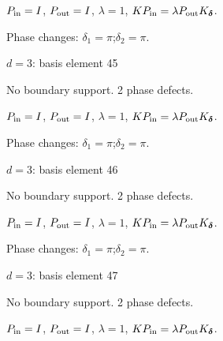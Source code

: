 \vspace{-1mm}
$P_{\rm in}=I$, \quad $P_{\rm out}=I$, \quad $\lambda=1$, \qquad $K P_{\rm in}=\lambda P_{\rm out}K_{\boldsymbol\delta}$.
\par\smallskip\begin{minipage}{.98\linewidth}\small Phase changes: $\delta_{1}=\pi$;\quad $\delta_{2}=\pi$.\end{minipage}
\vfill
{\footnotesize\texttt{}}
\newpage
{}
{\Large $d=3$: basis element 45}\par
No boundary support. 2 phase defects.
\begin{center}
\end{center}
\vspace{-1mm}
$P_{\rm in}=I$, \quad $P_{\rm out}=I$, \quad $\lambda=1$, \qquad $K P_{\rm in}=\lambda P_{\rm out}K_{\boldsymbol\delta}$.
\par\smallskip\begin{minipage}{.98\linewidth}\small Phase changes: $\delta_{1}=\pi$;\quad $\delta_{2}=\pi$.\end{minipage}
\vfill
{\footnotesize\texttt{}}
\newpage
{}
{\Large $d=3$: basis element 46}\par
No boundary support. 2 phase defects.
\begin{center}
\end{center}
\vspace{-1mm}
$P_{\rm in}=I$, \quad $P_{\rm out}=I$, \quad $\lambda=1$, \qquad $K P_{\rm in}=\lambda P_{\rm out}K_{\boldsymbol\delta}$.
\par\smallskip\begin{minipage}{.98\linewidth}\small Phase changes: $\delta_{1}=\pi$;\quad $\delta_{2}=\pi$.\end{minipage}
\vfill
{\footnotesize\texttt{}}
\newpage
{}
{\Large $d=3$: basis element 47}\par
No boundary support. 2 phase defects.
\begin{center}
\end{center}
\vspace{-1mm}
$P_{\rm in}=I$, \quad $P_{\rm out}=I$, \quad $\lambda=1$, \qquad $K P_{\rm in}=\lambda P_{\rm out}K_{\boldsymbol\delta}$.

